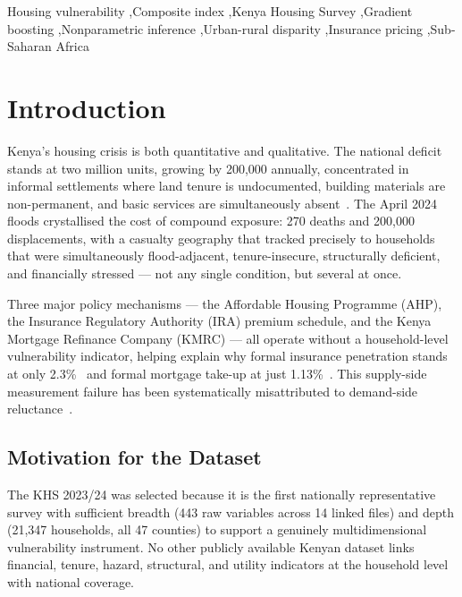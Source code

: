 \documentclass[3p,twocolumn,10pt]{elsarticle}
\begin{document}
\begin{frontmatter}
\begin{keyword}
Housing vulnerability \sep Composite index \sep Kenya Housing Survey \sep Gradient boosting \sep Nonparametric inference \sep Urban-rural disparity \sep Insurance pricing \sep Sub-Saharan Africa
\end{keyword}

\end{frontmatter}

\section{Introduction}
\label{sec:intro}

Kenya's housing crisis is both quantitative and qualitative. The national deficit stands at
two million units, growing by 200,000 annually, concentrated in informal settlements where
land tenure is undocumented, building materials are non-permanent, and basic services are
simultaneously absent~\cite{knbs2024khs,unhabitat2022housing}. The April 2024 floods
crystallised the cost of compound exposure: 270 deaths and 200,000 displacements, with a
casualty geography that tracked precisely to households that were simultaneously
flood-adjacent, tenure-insecure, structurally deficient, and financially stressed --- not
any single condition, but several at once.

Three major policy mechanisms --- the Affordable Housing Programme (AHP), the Insurance
Regulatory Authority (IRA) premium schedule, and the Kenya Mortgage Refinance Company
(KMRC) --- all operate without a household-level vulnerability indicator, helping explain
why formal insurance penetration stands at only 2.3\%~\cite{ira2024annual} and formal
mortgage take-up at just 1.13\%~\cite{mwangi2024kenya}. This supply-side measurement
failure has been systematically misattributed to demand-side reluctance~\cite{owusu2024african}.

\subsection{Motivation for the Dataset}

The KHS 2023/24 was selected because it is the first nationally representative survey with
sufficient breadth (443 raw variables across 14 linked files) and depth (21,347 households,
all 47 counties) to support a genuinely multidimensional vulnerability instrument. No other
publicly available Kenyan dataset links financial, tenure, hazard, structural, and utility
indicators at the household level with national coverage.
\end{document}
